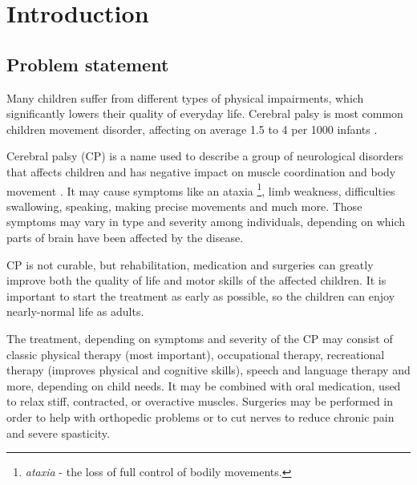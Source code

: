 \chapter{Introduction}
\label{sec:intro}
\section{Problem statement}
Many children suffer from different types of physical impairments, which significantly lowers their quality of everyday life. Cerebral palsy is most common children movement disorder, affecting on average 1.5 to 4 per 1000 infants \cite{stats}.

Cerebral palsy (CP) is a name used to describe a group of neurological disorders that affects children and has negative impact on muscle coordination and body movement \cite{main_site}. It may cause symptoms like an ataxia \footnote{\textit{ataxia} - the loss of full control of bodily movements.}, limb weakness, difficulties swallowing, speaking, making precise movements and much more. Those symptoms may vary in type and severity among individuals, depending on which parts of brain have been affected by the disease. 

CP is not curable, but rehabilitation, medication and surgeries can greatly improve both the quality of life and motor skills of the affected children. It is important to start the treatment as early as possible, so the children can enjoy nearly-normal life as adults.

The treatment, depending on symptoms and severity of the CP may consist of classic physical therapy (most important), occupational therapy, recreational therapy (improves physical and cognitive skills), speech and language therapy and more, depending on child needs. It may be combined with oral medication, used to relax stiff, contracted, or overactive muscles. Surgeries may be performed in order to help with orthopedic problems or to cut nerves to reduce chronic pain and severe spasticity.



